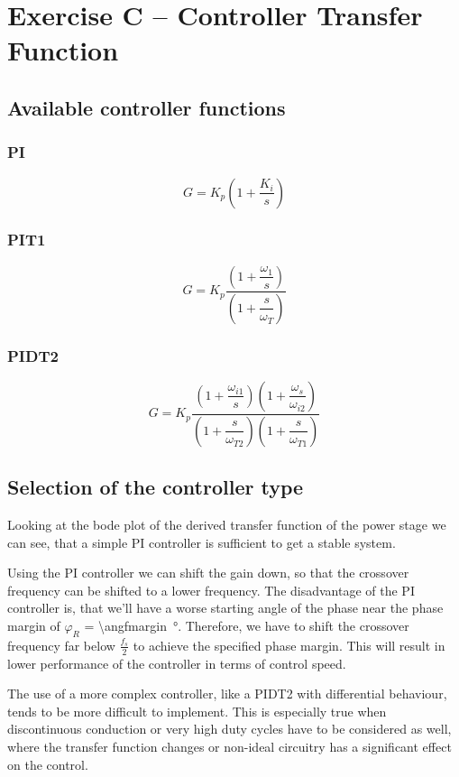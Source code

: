 \section{Exercise C -- Controller Transfer Function}

\subsection{Available controller functions}

\subsubsection{PI}
\[
	G
	= K_p \left(1 + \dfrac{K_i}{s} \right)
\]

\subsubsection{PIT1}
\[
	G
	= K_p \dfrac{
		\left(1 + \dfrac{\omega_{1}}{s}\right)
	}{ 
		\left(1 + \dfrac{s}{\omega_{T}} \right)
	}
\]
\subsubsection{PIDT2}

\[
	G
	= K_p \dfrac{
		\left(1 + \dfrac{\omega_{i1}}{s}\right) \left(1 + \dfrac{\omega_{s}}{\omega_{i2}}\right)
	}{ 
		\left(1 + \dfrac{s}{\omega_{T2}} \right) \left(1 + \dfrac{s}{\omega_{T1}} \right)
	}
\]

\subsection{Selection of the controller type}
Looking at the bode plot of the derived transfer function of the power stage
we can see, that a simple PI controller is sufficient to get a stable system.

Using the PI controller we can shift the gain down, so that the crossover
frequency can be shifted to a lower frequency. The disadvantage of the PI
controller is, that we'll have a worse starting angle of the phase near the
phase margin of $\varphi_R$ = \SI{\angfmargin}{\degree}. Therefore, we have to
shift the crossover frequency far below $\frac{f_s}{2}$ to achieve the specified
phase margin. This will result in lower performance of the controller in terms of
control speed.

The use of a more complex controller, like a PIDT2 with differential behaviour,
tends to be more difficult to implement. This is especially true when 
discontinuous conduction or very high duty cycles have to be considered as well,
where the transfer function changes or non-ideal circuitry has a significant
effect on the control.

